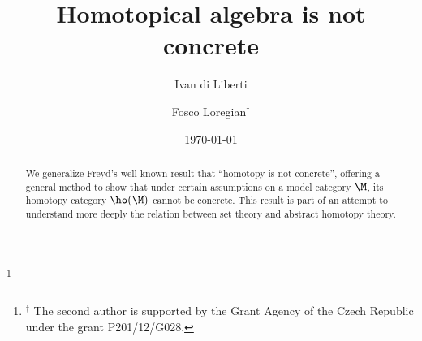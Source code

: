 \title{Homotopical algebra is not concrete}

\author{Ivan di Liberti}
\author{Fosco Loregian$^\dag$}
\thanks{$^\dag$ The second author is supported by the Grant Agency of the Czech Republic under the grant \textsc{P}201/12/\textsc{G}028.}
\address{
$^\dag$Department of Mathematics and Statistics\newline
Masaryk University, Faculty of Sciences\newline
Kotl\'{a}\v{r}sk\'{a} 2, 611 37 Brno, Czech Republic\newline
\href{mailto:diliberti@math.muni.cz}{\sf diliberti@math.muni.cz}\newline
\href{mailto:loregianf@math.muni.cz}{\sf loregianf@math.muni.cz}
}

\date{\today}
\maketitle 

\begin{abstract}
We generalize Freyd's well-known result that ``homotopy is not concrete'',
offering a general method to show that under certain assumptions on a model
category $\M$, its homotopy category $\ho(\M)$ cannot be concrete. 
This result is part of an attempt to understand more deeply the relation between 
set theory and abstract homotopy theory.
\end{abstract}